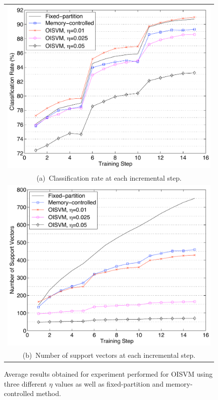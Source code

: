 \begin{figure}[t]
\footnotesize
  \begin{tabular}{@{}c@{}}
  \includegraphics[width=0.95\linewidth]{chi_cr}\\
  (a)~Classification rate at each incremental step.\vspace{0.1cm}\\
  \includegraphics[width=0.95\linewidth]{chi_sv}\\
  (b)~Number of support vectors at each incremental step.\\
  \end{tabular}
\caption{Average results obtained for experiment performed for
         OISVM using three different $\eta$ values as well as
         fixed-partition and memory-controlled method. }
\label{fig:chi}
\end{figure}
